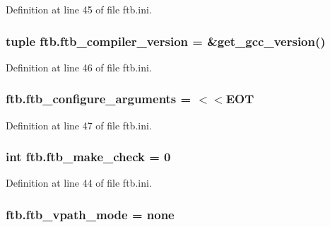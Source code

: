 Definition at line 45 of file ftb.\-ini.

\hypertarget{namespaceftb_a13bb6a052d4b7f9fcd48889879cf31e9}{
\subsubsection[{ftb\-\_\-compiler\-\_\-version}]{\setlength{\rightskip}{0pt plus 5cm}tuple ftb.\-ftb\-\_\-compiler\-\_\-version = \&get\-\_\-gcc\-\_\-version()}}\label{namespaceftb_a13bb6a052d4b7f9fcd48889879cf31e9}


Definition at line 46 of file ftb.\-ini.

\hypertarget{namespaceftb_ad086734056187d957ce104223812ec44}{
\subsubsection[{ftb\-\_\-configure\-\_\-arguments}]{\setlength{\rightskip}{0pt plus 5cm}ftb.\-ftb\-\_\-configure\-\_\-arguments = $<$$<$E\-O\-T}}\label{namespaceftb_ad086734056187d957ce104223812ec44}


Definition at line 47 of file ftb.\-ini.

\hypertarget{namespaceftb_a802fd0e9b4205267172fbff8637bc8ae}{
\subsubsection[{ftb\-\_\-make\-\_\-check}]{\setlength{\rightskip}{0pt plus 5cm}int ftb.\-ftb\-\_\-make\-\_\-check = 0}}\label{namespaceftb_a802fd0e9b4205267172fbff8637bc8ae}


Definition at line 44 of file ftb.\-ini.

\hypertarget{namespaceftb_ae1812ef9e1c7b0cc8fe32bc1183e452d}{
\subsubsection[{ftb\-\_\-vpath\-\_\-mode}]{\setlength{\rightskip}{0pt plus 5cm}ftb.\-ftb\-\_\-vpath\-\_\-mode = none}}\label{namespaceftb_ae1812ef9e1c7b0cc8fe32bc1183e452d}


